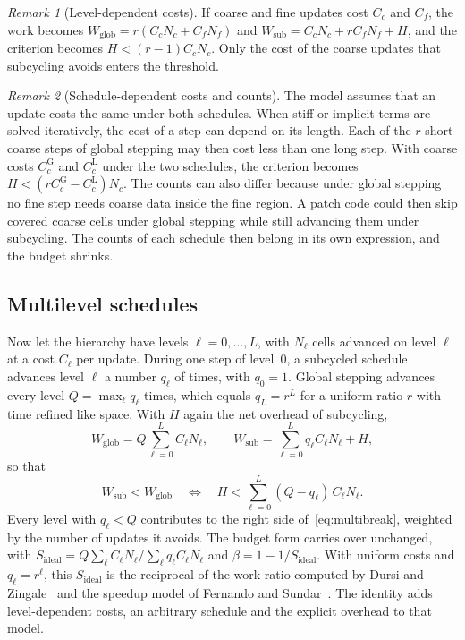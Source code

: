 \documentclass[12pt]{article}
\theoremstyle{remark}
\newtheorem{remark}{Remark}
\newcommand{\WG}{W_{\mathrm{glob}}}
\newcommand{\WL}{W_{\mathrm{sub}}}
\newcommand{\Sid}{S_{\mathrm{ideal}}}
\begin{document}
\begin{remark}[Level-dependent costs]\label{rem:costs}
If coarse and fine updates cost $C_c$ and $C_f$, the work becomes $\WG=r(C_cN_c+C_fN_f)$ and $\WL=C_cN_c+rC_fN_f+H$, and the criterion becomes $H<(r-1)C_cN_c$. Only the cost of the coarse updates that subcycling avoids enters the threshold.
\end{remark}

\begin{remark}[Schedule-dependent costs and counts]\label{rem:schedule}
The model assumes that an update costs the same under both schedules. When stiff or implicit terms are solved iteratively, the cost of a step can depend on its length. Each of the $r$ short coarse steps of global stepping may then cost less than one long step. With coarse costs $C_c^{\mathrm{G}}$ and $C_c^{\mathrm{L}}$ under the two schedules, the criterion becomes $H<(rC_c^{\mathrm{G}}-C_c^{\mathrm{L}})N_c$. The counts can also differ because under global stepping no fine step needs coarse data inside the fine region. A patch code could then skip covered coarse cells under global stepping while still advancing them under subcycling. The counts of each schedule then belong in its own expression, and the budget shrinks.
\end{remark}

\subsection{Multilevel schedules}\label{sec:multi}

Now let the hierarchy have levels $\ell=0,\dots,L$, with $N_\ell$ cells advanced on level $\ell$ at a cost $C_\ell$ per update. During one step of level~0, a subcycled schedule advances level $\ell$ a number $q_\ell$ of times, with $q_0=1$. Global stepping advances every level $Q=\max_\ell q_\ell$ times, which equals $q_L=r^L$ for a uniform ratio $r$ with time refined like space. With $H$ again the net overhead of subcycling,
\begin{equation}\label{eq:multiwork}
\WG=Q\sum_{\ell=0}^{L}C_\ell N_\ell,\qquad \WL=\sum_{\ell=0}^{L}q_\ell C_\ell N_\ell+H,
\end{equation}
so that
\begin{equation}\label{eq:multibreak}
\WL<\WG \quad\Longleftrightarrow\quad H<\sum_{\ell=0}^{L}(Q-q_\ell)\,C_\ell N_\ell .
\end{equation}
Every level with $q_\ell<Q$ contributes to the right side of~\eqref{eq:multibreak}, weighted by the number of updates it avoids. The budget form carries over unchanged, with $\Sid=Q\sum_\ell C_\ell N_\ell/\sum_\ell q_\ell C_\ell N_\ell$ and $\beta=1-1/\Sid$. With uniform costs and $q_\ell=r^\ell$, this $\Sid$ is the reciprocal of the work ratio computed by Dursi and Zingale~\cite{dursi2005efficiency} and the speedup model of Fernando and Sundar~\cite{fernando2022scalable}. The identity adds level-dependent costs, an arbitrary schedule and the explicit overhead to that model.
\end{document}
